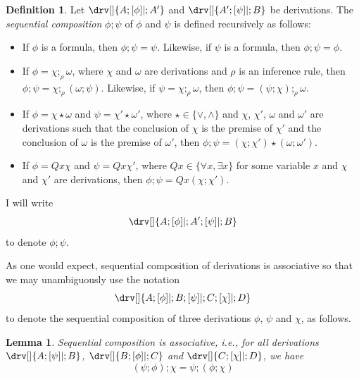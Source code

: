 \documentclass[10pt]{article}
\newtheorem{lemma}[theorem]{Lemma}
\theoremstyle{definition}\newtheorem{remark}[theorem]{Remark}
\theoremstyle{definition}\newtheorem{example}[theorem]{Example}
\theoremstyle{definition}\newtheorem{definition}[theorem]{Definition}
\newcommand{\compByInf}[1]{;_{#1}}
\newcommand{\seqComp}{;}
\begin{document}
	\begin{definition}
		Let $\drv[] {A ; [\phi]| ; A'}$ and $\drv[] {A' ; [\psi]| ; B}$ be derivations. The \textit{sequential composition} $\phi \seqComp \psi$ of $\phi$ and $\psi$ is defined recursively as follows:
		
		\begin{itemize}
			\item If $\phi$ is a formula, then $\phi \seqComp \psi = \psi$. Likewise, if $\psi$ is a formula, then $\phi \seqComp \psi = \phi$.
			
			\item If $\phi = \chi \compByInf{\rho} \omega$, where $\chi$ and $\omega$ are derivations and $\rho$ is an inference rule, then $\phi \seqComp \psi = \chi \compByInf{\rho} (\omega \seqComp \psi)$. Likewise, if $\psi = \chi \compByInf{\rho} \omega$, then $\phi \seqComp \psi = (\psi \seqComp \chi) \compByInf{\rho} \omega$.
			
			\item If $\phi = \chi \star \omega$ and $\psi = \chi' \star \omega'$, where $\star \in \{\lor, \land\}$ and $\chi$, $\chi'$, $\omega$ and $\omega'$ are derivations such that the conclusion of $\chi$ is the premise of $\chi'$ and the conclusion of $\omega$ is the premise of $\omega'$, then $\phi \seqComp \psi = (\chi \seqComp \chi') \star (\omega \seqComp \omega')$.
			
			\item If $\phi = Qx \chi$ and $\psi = Qx \chi'$, where $Qx \in \{\forall x, \exists x\}$ for some variable $x$ and $\chi$ and $\chi'$ are derivations, then $\phi \seqComp \psi = Qx (\chi \seqComp \chi')$.
		\end{itemize}
		
		I will write
		\[
			\drv[] {A ; [\phi]| ; A' ; [\psi]| ; B}
		\]
		to denote $\phi \seqComp \psi$.
	\end{definition}

	As one would expect, sequential composition of derivations is associative so that we may unambiguously use the notation
	\[
		\drv[] {
			A ; [\phi]| ; B ; [\psi]| ; C ; [\chi]| ; D
		}
	\]
	to denote the sequential composition of three derivations $\phi$, $\psi$ and $\chi$, as follows.

	\begin{lemma}
		Sequential composition is associative, i.e., for all derivations $\drv[] {A ; [\psi]| ; B}$, $\drv[] {B ; [\phi]| ; C}$ and $\drv[] {C ; [\chi]| ; D}$, we have
		\[
			(\psi \seqComp \phi) \seqComp \chi = \psi \seqComp (\phi \seqComp \chi)
		\]
	\end{lemma}
\end{document}
